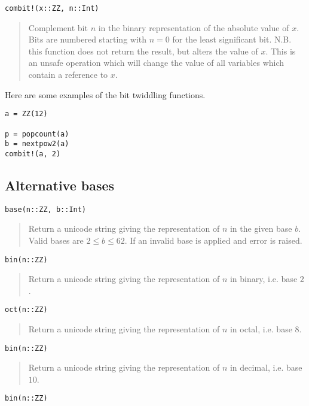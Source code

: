 \documentclass[a4paper,10pt]{article}
\newcommand{\desc}[1]{\vspace{-3mm}\begin{quote}#1\end{quote}}
\begin{document}
{{{\begin{lstlisting}
combit!(x::ZZ, n::Int)
\end{lstlisting}

\desc{Complement bit $n$ in the binary representation of the absolute value of $x$. Bits
are numbered starting with $n = 0$ for the least significant bit. N.B. this function does
not return the result, but alters the value of $x$. This is an unsafe operation which will
change the value of all variables which contain a reference to $x$.}

Here are some examples of the bit twiddling functions.

\begin{lstlisting}
a = ZZ(12)

p = popcount(a)
b = nextpow2(a)
combit!(a, 2)
\end{lstlisting}

\subsection{Alternative bases}

\begin{lstlisting}
base(n::ZZ, b::Int)
\end{lstlisting}

\desc{Return a unicode string giving the representation of $n$ in the given base $b$. Valid
bases are $2 \leq b \leq 62$. If an invalid base is applied and error is raised.}

\begin{lstlisting}
bin(n::ZZ)
\end{lstlisting}

\desc{Return a unicode string giving the representation of $n$ in binary, i.e. base $2$.}

\begin{lstlisting}
oct(n::ZZ)
\end{lstlisting}

\desc{Return a unicode string giving the representation of $n$ in octal, i.e. base $8$.}

\begin{lstlisting}
bin(n::ZZ)
\end{lstlisting}

\desc{Return a unicode string giving the representation of $n$ in decimal, i.e. base $10$.}

\begin{lstlisting}
bin(n::ZZ)
\end{lstlisting}

}}}
\end{document}
